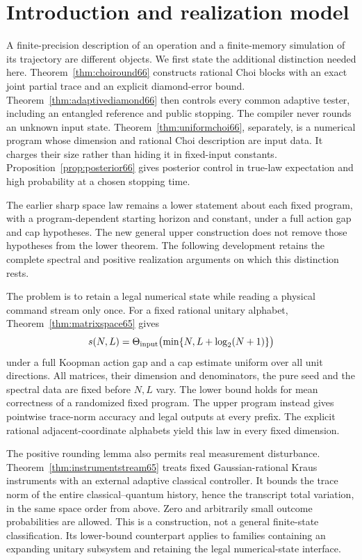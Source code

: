 \section{Introduction and realization model}
A finite-precision description of an operation and a finite-memory
simulation of its trajectory are different objects. We first state the
additional distinction needed here. Theorem~\ref{thm:choiround66}
constructs rational Choi blocks with an exact joint partial trace and
an explicit diamond-error bound. Theorem~\ref{thm:adaptivediamond66}
then controls every common adaptive tester, including an entangled
reference and public stopping. The compiler never rounds an unknown
input state. Theorem~\ref{thm:uniformchoi66}, separately, is a numerical
program whose dimension and rational Choi description are input data.
It charges their size rather than hiding it in fixed-input constants.
Proposition~\ref{prop:posterior66} gives posterior control in true-law
expectation and high probability at a chosen stopping time.

The earlier sharp space law remains a lower statement about each fixed
program, with a program-dependent starting horizon and constant,
under a full action gap and cap hypotheses. The new general upper
construction does not remove those hypotheses from the lower theorem.
The following development retains the complete spectral and positive
realization arguments on which this distinction rests.


The problem is to retain a legal numerical state while reading a
physical command stream only once. For a fixed rational unitary
alphabet, Theorem~\ref{thm:matrixspace65} gives
\[
 s(N,L)=\Theta_{\rm input}\bigl(\min\{N,L+\log_2(N+1)\}\bigr)
\]
under a full Koopman action gap and a cap estimate uniform over
all unit directions. All matrices, their dimension and denominators,
the pure seed and the spectral data are fixed before $N,L$ vary.
The lower bound holds for mean correctness of a randomized fixed
program. The upper program instead gives pointwise trace-norm
accuracy and legal outputs at every prefix. The explicit rational
adjacent-coordinate alphabets yield this law in every fixed dimension.

The positive rounding lemma also permits real measurement disturbance.
Theorem~\ref{thm:instrumentstream65} treats fixed Gaussian-rational
Kraus instruments with an external adaptive classical controller.
It bounds the trace norm of the entire classical--quantum history,
hence the transcript total variation, in the same space order from
above. Zero and arbitrarily small outcome probabilities are allowed.
This is a construction, not a general finite-state classification.
Its lower-bound counterpart applies to families containing an
expanding unitary subsystem and retaining the legal numerical-state
interface.

